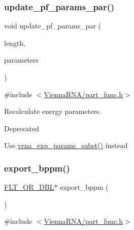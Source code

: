 \subsubsection{\texorpdfstring{update\+\_\+pf\+\_\+params\+\_\+par()}{update\_pf\_params\_par()}}
{\footnotesize\ttfamily void update\+\_\+pf\+\_\+params\+\_\+par (\begin{DoxyParamCaption}\item[{int}]{length,  }\item[{\mbox{\hyperlink{group__energy__parameters_ga01d8b92fe734df8d79a6169482c7d8d8}{vrna\+\_\+exp\+\_\+param\+\_\+t}} $\ast$}]{parameters }\end{DoxyParamCaption})}



{\ttfamily \#include $<$\mbox{\hyperlink{part__func_8h}{Vienna\+R\+N\+A/part\+\_\+func.\+h}}$>$}



Recalculate energy parameters. 

\begin{DoxyRefDesc}{Deprecated}
\item[\mbox{\hyperlink{deprecated__deprecated000108}{Deprecated}}]Use \mbox{\hyperlink{group__energy__parameters_ga8e7ac4fab3b0cc03afbc134eaafb3525}{vrna\+\_\+exp\+\_\+params\+\_\+subst()}} instead\end{DoxyRefDesc}
\mbox{\label{group__pf__fold_gac5ac7ee281aae1c5cc5898a841178073}} 
\subsubsection{\texorpdfstring{export\+\_\+bppm()}{export\_bppm()}}
{\footnotesize\ttfamily \mbox{\hyperlink{group__data__structures_ga31125aeace516926bf7f251f759b6126}{F\+L\+T\+\_\+\+O\+R\+\_\+\+D\+BL}}$\ast$ export\+\_\+bppm (\begin{DoxyParamCaption}\item[{void}]{ }\end{DoxyParamCaption})}



{\ttfamily \#include $<$\mbox{\hyperlink{part__func_8h}{Vienna\+R\+N\+A/part\+\_\+func.\+h}}$>$}



